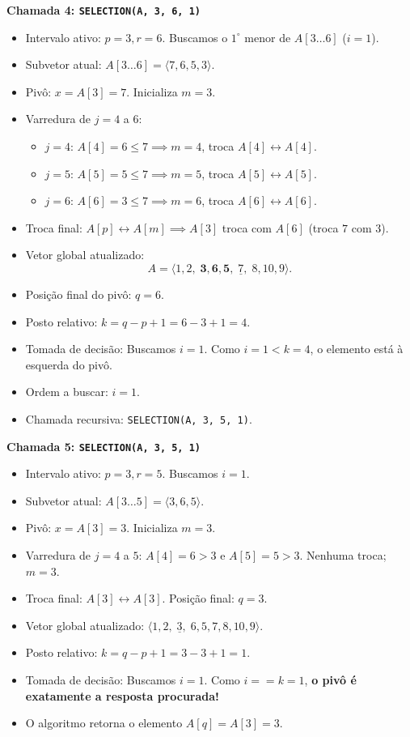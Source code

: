\documentclass[11pt,a4paper]{article}
\newcommand{\destaque}[1]{\textbf{\color{azul}#1}}
\begin{document}
\vspace{4pt}
\destaque{Chamada 4: \texttt{SELECTION(A, 3, 6, 1)}}
\begin{itemize}
    \item Intervalo ativo: $p = 3, r = 6$. Buscamos o $1^\circ$ menor de $A[3 \dots 6]$ ($i = 1$).
    \item Subvetor atual: $A[3 \dots 6] = \langle 7, 6, 5, 3 \rangle$.
    \item Pivô: $x = A[3] = 7$. Inicializa $m = 3$.
    \item Varredura de $j = 4$ a $6$:
    \begin{itemize}
        \item $j=4$: $A[4]=6 \le 7 \implies m=4$, troca $A[4] \leftrightarrow A[4]$.
        \item $j=5$: $A[5]=5 \le 7 \implies m=5$, troca $A[5] \leftrightarrow A[5]$.
        \item $j=6$: $A[6]=3 \le 7 \implies m=6$, troca $A[6] \leftrightarrow A[6]$.
    \end{itemize}
    \item Troca final: $A[p] \leftrightarrow A[m] \implies A[3]$ troca com $A[6]$ (troca $7$ com $3$).
    \item Vetor global atualizado:
    \[
    A = \langle 1, 2, \;\mathbf{3, 6, 5},\; \underline{7},\; 8, 10, 9 \rangle.
    \]
    \item Posição final do pivô: $q = 6$.
    \item Posto relativo: $k = q - p + 1 = 6 - 3 + 1 = 4$.
    \item Tomada de decisão: Buscamos $i = 1$. Como $i = 1 < k = 4$, o elemento está à esquerda do pivô.
    \item Ordem a buscar: $i = 1$.
    \item Chamada recursiva: \texttt{SELECTION(A, 3, 5, 1)}.
\end{itemize}

\vspace{4pt}
\destaque{Chamada 5: \texttt{SELECTION(A, 3, 5, 1)}}
\begin{itemize}
    \item Intervalo ativo: $p = 3, r = 5$. Buscamos $i = 1$.
    \item Subvetor atual: $A[3 \dots 5] = \langle 3, 6, 5 \rangle$.
    \item Pivô: $x = A[3] = 3$. Inicializa $m = 3$.
    \item Varredura de $j = 4$ a $5$: $A[4]=6 > 3$ e $A[5]=5 > 3$. Nenhuma troca; $m = 3$.
    \item Troca final: $A[3] \leftrightarrow A[3]$. Posição final: $q = 3$.
    \item Vetor global atualizado: $\langle 1, 2, \;\underline{3},\; 6, 5, 7, 8, 10, 9 \rangle$.
    \item Posto relativo: $k = q - p + 1 = 3 - 3 + 1 = 1$.
    \item Tomada de decisão: Buscamos $i = 1$. Como $i == k = 1$, \destaque{o pivô é exatamente a resposta procurada!}
    \item O algoritmo retorna o elemento $A[q] = A[3] = 3$.
\end{itemize}
\end{document}
